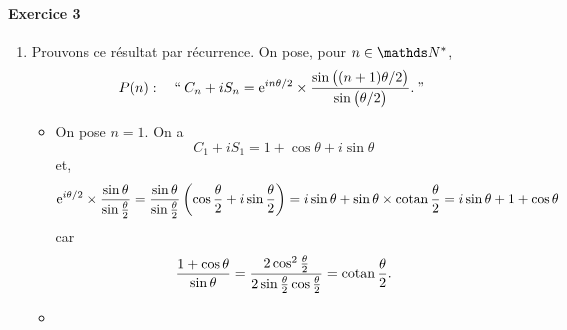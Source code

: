 \documentclass[a4paper]{article}
\begin{document}
	\paragraph{Exercice 3}
	\begin{enumerate}
		\item Prouvons ce résultat par récurrence. On pose, pour $n \in \N^*$, \[
				P(n):\quad``\:C_n + i S_n = \mathrm{e}^{in\theta/2} \times \frac{\sin\big((n+1)\theta / 2\big)}{\sin\big(\theta / 2\big)}.\:"
			\]
			\begin{itemize}
				\item On pose $n = 1$. On a 
					\[
						C_1 + i S_1 = 1 + \cos \theta + i \sin \theta
					\] et, \[
						\mathrm{e}^{i\theta/2} \times \frac{\sin \theta}{\sin \frac{\theta}{2}} = \frac{\sin \theta}{\sin \frac{\theta}{2}} \left( \cos \frac{\theta}{2} + i \sin \frac{\theta}{2} \right) = i \sin \theta + \sin \theta \times \operatorname{cotan} \frac{\theta}{2} = i \sin \theta + 1 + \cos \theta
					\] car \[
						\frac{1 + \cos \theta}{\sin \theta} = \frac{2 \cos^2 \frac{\theta}{2}}{2 \sin \frac{\theta}{2} \cos \frac{\theta}{2}} = \operatorname{cotan} \frac{\theta}{2}
					.\]
				\item 
			\end{itemize}
	\end{enumerate}
\end{document}
